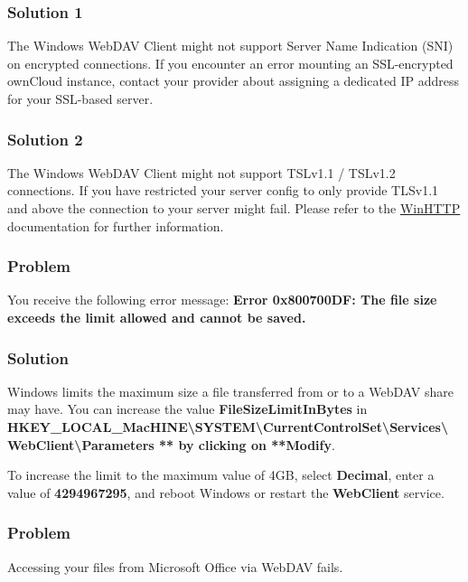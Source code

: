 \documentclass[letterpaper,10pt,english]{sphinxmanual}
\begin{document}
\subsubsection{Solution 1}
\label{files/access_webdav:solution-1}
The Windows WebDAV Client might not support Server Name Indication (SNI) on
encrypted connections. If you encounter an error mounting an SSL-encrypted
ownCloud instance, contact your provider about assigning a dedicated IP address
for your SSL-based server.


\subsubsection{Solution 2}
\label{files/access_webdav:solution-2}
The Windows WebDAV Client might not support TSLv1.1 / TSLv1.2 connections. If
you have restricted your server config to only provide TLSv1.1 and above the
connection to your server might fail. Please refer to the \href{https://msdn.microsoft.com/en-us/library/windows/desktop/aa382925.aspx\#WinHTTP\_5.1\_Features}{WinHTTP} documentation
for further information.


\subsubsection{Problem}
\label{files/access_webdav:id4}\label{files/access_webdav:winhttp}
You receive the following error message: \textbf{Error 0x800700DF: The file size
exceeds the limit allowed and cannot be saved.}


\subsubsection{Solution}
\label{files/access_webdav:id5}
Windows limits the maximum size a file transferred from or to  a WebDAV share
may have.  You can increase the value \textbf{FileSizeLimitInBytes} in
\textbf{HKEY\_LOCAL\_MacHINE\textbackslash{}SYSTEM\textbackslash{}CurrentControlSet\textbackslash{}Services\textbackslash{}WebClient\textbackslash{}Parameters
** by clicking on **Modify}.

To increase the limit to the maximum value of 4GB, select \textbf{Decimal}, enter a
value of \textbf{4294967295}, and reboot Windows or restart the \textbf{WebClient}
service.


\subsubsection{Problem}
\label{files/access_webdav:id6}
Accessing your files from Microsoft Office via WebDAV fails.
\end{document}
